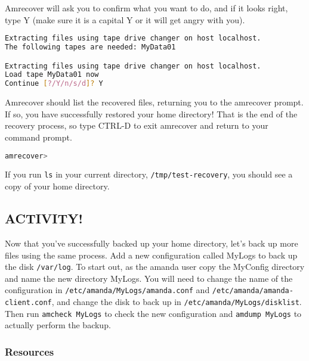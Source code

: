 \documentclass{article}
\begin{document}
\begin{enumerate}
Amrecover will ask you to confirm what you want to do, and if it looks right, type Y (make sure it is a capital Y or it will get angry with you).

\begin{lstlisting}[basicstyle=\ttfamily, backgroundcolor = \color{lightgray}, language = bash, xleftmargin = 0cm, framexleftmargin = 1em]
Extracting files using tape drive changer on host localhost.
The following tapes are needed: MyData01

Extracting files using tape drive changer on host localhost.
Load tape MyData01 now
Continue [?/Y/n/s/d]? Y
\end{lstlisting}

Amrecover should list the recovered files, returning you to the amrecover prompt. If so, you have successfully restored your home directory! That is the end of the recovery process, so type CTRL-D to exit amrecover and return to your command prompt.

\begin{lstlisting}[basicstyle=\ttfamily, backgroundcolor = \color{lightgray}, language = bash, xleftmargin = 0cm, framexleftmargin = 1em]
amrecover>
\end{lstlisting}

If you run \verb|ls| in your current directory, \verb|/tmp/test-recovery|, you should see a copy of your home directory.

\end{enumerate}


\subsection*{ACTIVITY!}

\indent\indent Now that you've successfully backed up your home directory, let's back up more files using the same process. Add a new configuration called MyLogs to back up the disk \verb|/var/log|. To start out, as the amanda user copy the MyConfig directory and name the new directory MyLogs. You will need to change the name of the configuration in \verb|/etc/amanda/MyLogs/amanda.conf| and \verb|/etc/amanda/amanda-client.conf|, and change the disk to back up in \verb|/etc/amanda/MyLogs/disklist|. Then run \verb|amcheck MyLogs| to check the new configuration and \verb|amdump MyLogs| to actually perform the backup.


\subsubsection*{Resources}
\end{document}
